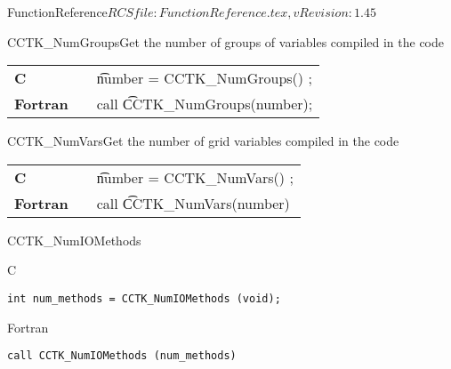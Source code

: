 \begin{cactuspart}{5}{FunctionReference}{$RCSfile: FunctionReference.tex,v $}{$Revision: 1.45 $}
\begin{CCTKFunc}{CCTK\_NumGroups}{Get the number of groups of variables compiled in the code}
\label{CCTK-NumGroups}
\showargs
\begin{params}
\end{params}
\begin{discussion}
\end{discussion}
\begin{examples}
\begin{tabular}{@{}p{3cm}cp{11cm}}
\hfill {\bf C} && {\t number = CCTK\_NumGroups() };
\\
\hfill {\bf Fortran} && call {\t CCTK\_NumGroups(number)};
\\
\end{tabular}
\end{examples}
\begin{errorcodes}
\end{errorcodes}
\end{CCTKFunc}


\begin{CCTKFunc}{CCTK\_NumVars}{Get the number of grid variables compiled in the code}
\label{CCTK-NumVars}
\showargs
\begin{params}
\end{params}
\begin{discussion}
\end{discussion}
\begin{examples}
\begin{tabular}{@{}p{3cm}cp{11cm}}
\hfill {\bf C} && {\t number = CCTK\_NumVars() };
\\
\hfill {\bf Fortran} && call {\t CCTK\_NumVars(number)}
\\
\end{tabular}
\end{examples}
\begin{errorcodes}
\end{errorcodes}
\end{CCTKFunc}





\begin{FunctionDescription}{CCTK\_NumIOMethods}
\label{CCTK-NumIOMethods}
\begin{Synopsis}{C}
\begin{verbatim}
int num_methods = CCTK_NumIOMethods (void);
\end{verbatim}
\end{Synopsis}
\begin{Synopsis}{Fortran}
\begin{verbatim}
call CCTK_NumIOMethods (num_methods)


\end{verbatim}
\end{Synopsis}
\end{FunctionDescription}
\end{cactuspart}
